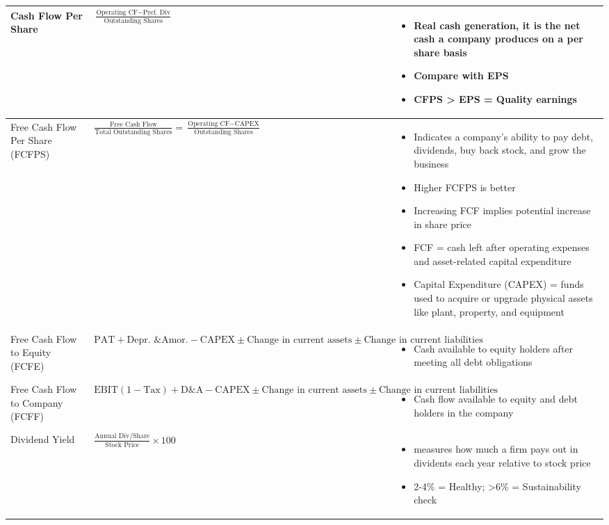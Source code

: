 \documentclass[12pt]{article}
\begin{document}
\renewcommand{\arraystretch}{1.5}
\begin{longtable}{|>{\raggedright\arraybackslash}m{4.5cm}|>{\raggedright\arraybackslash}m{5cm}|>{\raggedright\arraybackslash}m{6cm}|}
\hline
Cash Flow Per Share & 
$\frac{\text{Operating CF} - \text{Pref. Div}}{\text{Outstanding Shares}}$ &
\begin{itemize}
\item Real cash generation, it is the net cash a company produces on a per share basis
\item Compare with EPS
\item CFPS > EPS = Quality earnings
\end{itemize} \\
\hline

Free Cash Flow Per Share (FCFPS) & 
$\frac{\text{Free Cash Flow}}{\text{Total Outstanding Shares}} = \frac{\text{Operating CF} - \text{CAPEX}}{\text{Outstanding Shares}}$ &
\begin{itemize}
\item Indicates a company's ability to pay debt, dividends, buy back stock, and grow the business
\item Higher FCFPS is better
\item Increasing FCF implies potential increase in share price
\item FCF = cash left after operating expenses and asset-related capital expenditure
\item Capital Expenditure (CAPEX) = funds used to acquire or upgrade physical assets like plant, property, and equipment
\end{itemize} \\
\hline

Free Cash Flow to Equity (FCFE) & 
$\text{PAT} + \text{Depr. \& Amor.} - \text{CAPEX} \pm \text{Change in current assets} \pm \text{Change in current liabilities}$ &
\begin{itemize}
\item Cash available to equity holders after meeting all debt obligations
\end{itemize} \\
\hline

Free Cash Flow to Company (FCFF) & 
$\text{EBIT}(1-\text{Tax}) + \text{D\&A} - \text{CAPEX} \pm \text{Change in current assets} \pm \text{Change in current liabilities}$ &
\begin{itemize}
\item Cash flow available to equity and debt holders in the company
\end{itemize} \\
\hline

Dividend Yield & 
$\frac{\text{Annual Div/Share}}{\text{Stock Price}} \times 100$ &
\begin{itemize}
\item measures how much a firm pays out in dividents each year relative to stock price
\item 2-4\% = Healthy; >6\% = Sustainability check
\end{itemize} \\
\hline
\end{longtable}
\end{document}
